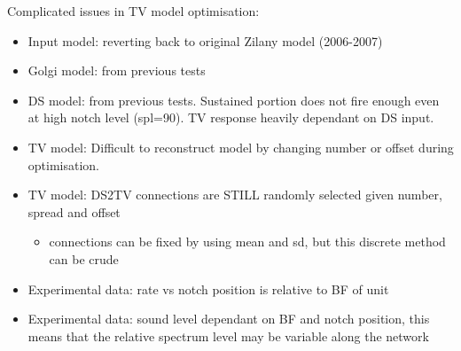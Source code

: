 









Complicated issues in TV model optimisation:
\begin{itemize}
\item Input model: reverting back to original Zilany model (2006-2007)
\item Golgi model: from previous tests 
\item DS model: from previous tests.  Sustained portion does not fire enough
  even at high notch level (spl=90).  TV response heavily dependant on DS input.
\item TV model: Difficult to reconstruct model by changing number or offset
  during optimisation.
\item TV model: DS2TV connections are STILL randomly selected given number,
  spread and offset
  \begin{itemize}
  \item connections can be fixed by using mean and sd, but this discrete method can be crude
  \end{itemize}
\item Experimental data: rate vs notch position is relative to BF of unit
\item Experimental data: sound level dependant on BF and notch position, this
  means that the relative spectrum level may be variable along the network
\end{itemize}

